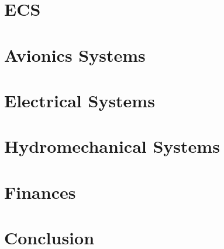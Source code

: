 \documentclass[12pt]{article} %
\numberwithin{figure}{section}
\numberwithin{table}{section}
\begin{document}
\newpage
\setcounter{page}{1}
\section{ECS}
    

\newpage
\setcounter{page}{1}
\section{Avionics Systems}
    

\newpage
\setcounter{page}{1}
\section{Electrical Systems}
    

\newpage
\setcounter{page}{1}
\section{Hydromechanical Systems}
    

\newpage
\setcounter{page}{1}
\section{Finances}
    

\newpage
\setcounter{page}{1}
\section{Conclusion}
    


\end{document}
